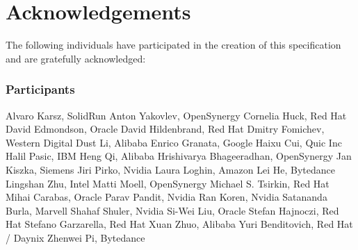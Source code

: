 \chapter{Acknowledgements}\label{chap:Acknowledgements}

The following individuals have participated in the creation of this specification and are gratefully acknowledged:

\subsection*{Participants}
Alvaro Karsz, SolidRun \newline
Anton Yakovlev, OpenSynergy \newline
Cornelia Huck, Red Hat \newline
David Edmondson, Oracle \newline
David Hildenbrand, Red Hat \newline
Dmitry Fomichev, Western Digital \newline
Dust Li, Alibaba \newline
Enrico Granata, Google \newline
Haixu Cui, Quic Inc \newline
Halil Pasic, IBM \newline
Heng Qi, Alibaba \newline
Hrishivarya Bhageeradhan, OpenSynergy \newline
Jan Kiszka, Siemens \newline
Jiri Pirko, Nvidia \newline
Laura Loghin, Amazon \newline
Lei He, Bytedance \newline
Lingshan Zhu, Intel \newline
Matti Moell, OpenSynergy \newline
Michael S. Tsirkin, Red Hat \newline
Mihai Carabas, Oracle \newline
Parav Pandit, Nvidia \newline
Ran Koren, Nvidia \newline
Satananda Burla, Marvell \newline
Shahaf Shuler, Nvidia \newline
Si-Wei Liu, Oracle \newline
Stefan Hajnoczi, Red Hat \newline
Stefano Garzarella, Red Hat \newline
Xuan Zhuo, Alibaba \newline
Yuri Benditovich, Red Hat / Daynix \newline
Zhenwei Pi, Bytedance \newline

